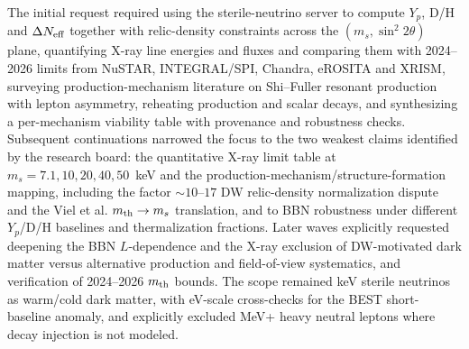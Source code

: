 \documentclass[11pt,a4paper]{article}
\begin{document}
The initial request required using the sterile-neutrino server to compute $Y_{p}$, D/H and $\Delta N_{\rm eff}$ together with relic-density constraints across the $(m_{s},\sin^{2}2\theta)$ plane, quantifying X-ray line energies and fluxes and comparing them with 2024--2026 limits from NuSTAR, INTEGRAL/SPI, Chandra, eROSITA and XRISM, surveying production-mechanism literature on Shi--Fuller resonant production with lepton asymmetry, reheating production and scalar decays, and synthesizing a per-mechanism viability table with provenance and robustness checks. Subsequent continuations narrowed the focus to the two weakest claims identified by the research board: the quantitative X-ray limit table at $m_{s}=7.1,10,20,40,50$~keV and the production-mechanism/structure-formation mapping, including the factor $\sim10$--$17$ DW relic-density normalization dispute and the Viel et al. $m_{\rm th}\to m_{s}$ translation, and to BBN robustness under different $Y_{p}$/D/H baselines and thermalization fractions. Later waves explicitly requested deepening the BBN $L$-dependence and the X-ray exclusion of DW-motivated dark matter versus alternative production and field-of-view systematics, and verification of 2024--2026 $m_{\rm th}$ bounds. The scope remained keV sterile neutrinos as warm/cold dark matter, with eV-scale cross-checks for the BEST short-baseline anomaly, and explicitly excluded MeV+ heavy neutral leptons where decay injection is not modeled.
\end{document}
